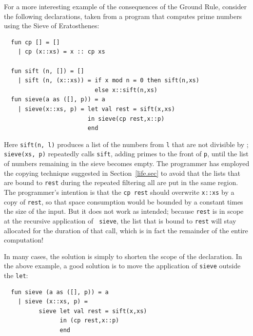 \documentclass[12pt]{book}
\begin{document}
For a more interesting example of the consequences of the Ground Rule,
consider the following declarations, taken from a program that
computes prime numbers using the
%
Sieve of Eratosthenes:
\begin{verbatim}
  fun cp [] = []
    | cp (x::xs) = x :: cp xs

  fun sift (n, []) = []
    | sift (n, (x::xs)) = if x mod n = 0 then sift(n,xs)
                          else x::sift(n,xs)
  fun sieve(a as ([], p)) = a
    | sieve(x::xs, p) = let val rest = sift(x,xs)
                        in sieve(cp rest,x::p)
                        end
\end{verbatim}
Here {\tt sift(n, l)} produces a list of the numbers from {\tt l} that
are not divisible by ; {\tt sieve(xs, p)} repeatedly calls
{\tt sift}, adding primes to the front of {\tt p}, until the list of
numbers remaining in the sieve becomes empty. The programmer has
employed the copying technique suggested in Section~\ref{life.sec} to
avoid that the lists that are bound to {\tt rest} during the repeated
filtering all are put in the same region. The programmer's intention
is that the {\tt cp rest} should overwrite {\tt x::xs} by a copy of
{\tt rest}, so that space consumption would be bounded by a constant
times the size of the input.  But it does not work as intended;
because {\tt rest} is in scope at the recursive application of {\tt
  sieve}, the list that is bound to {\tt rest} will stay allocated for
the duration of that call, which is in fact the remainder of the
entire computation!

In many cases, the solution is simply to shorten the scope of the
declaration.  In the above example, a good solution is to move the
application of {\tt sieve} outside the {\tt let}:
\begin{verbatim}
  fun sieve (a as ([], p)) = a
    | sieve (x::xs, p) =
          sieve let val rest = sift(x,xs)
                in (cp rest,x::p)
                end
\end{verbatim}
\end{document}
